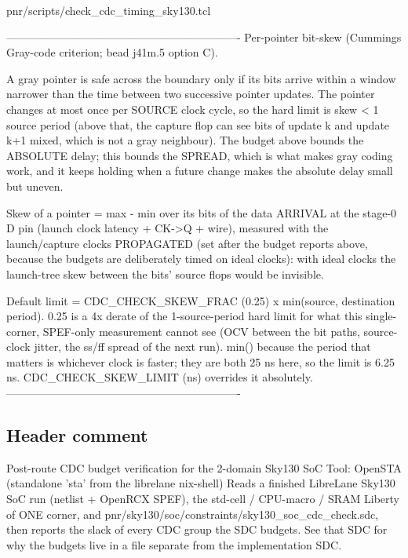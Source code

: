 \begin{relocated}{pnr/scripts/check_cdc_timing_sky130.tcl}
\begin{textblock}
----------------------------------------------------------------
Per-pointer bit-skew (Cummings Gray-code criterion; bead j41m.5 option C).

A gray pointer is safe across the boundary only if its bits arrive within a window narrower
than the time between two successive pointer updates. The pointer changes at most once per
SOURCE clock cycle, so the hard limit is skew < 1 source period (above that, the capture flop
can see bits of update k and update k+1 mixed, which is not a gray neighbour). The budget
above bounds the ABSOLUTE delay; this bounds the SPREAD, which is what makes gray coding
work, and it keeps holding when a future change makes the absolute delay small but uneven.

Skew of a pointer = max - min over its bits of the data ARRIVAL at the stage-0 D pin (launch
clock latency + CK->Q + wire), measured with the launch/capture clocks PROPAGATED (set after
the budget reports above, because the budgets are deliberately timed on ideal clocks): with
ideal clocks the launch-tree skew between the bits' source flops would be invisible.

Default limit = CDC_CHECK_SKEW_FRAC (0.25) x min(source, destination period). 0.25 is a 4x
derate of the 1-source-period hard limit for what this single-corner, SPEF-only measurement
cannot see (OCV between the bit paths, source-clock jitter, the ss/ff spread of the next
run). min() because the period that matters is whichever clock is faster; they are both 25 ns
here, so the limit is 6.25 ns. CDC_CHECK_SKEW_LIMIT (ns) overrides it absolutely.
----------------------------------------------------------------
\end{textblock}

\subsection*{Header comment}

\begin{textblock}
Post-route CDC budget verification for the 2-domain Sky130 SoC
Tool: OpenSTA (standalone 'sta' from the librelane nix-shell)
Reads a finished LibreLane Sky130 SoC run (netlist + OpenRCX SPEF), the std-cell / CPU-macro /
SRAM Liberty of ONE corner, and pnr/sky130/soc/constraints/sky130_soc_cdc_check.sdc, then
reports the slack of every CDC group the SDC budgets. See that SDC for why the budgets live
in a file separate from the implementation SDC.
\end{textblock}


\end{relocated}
